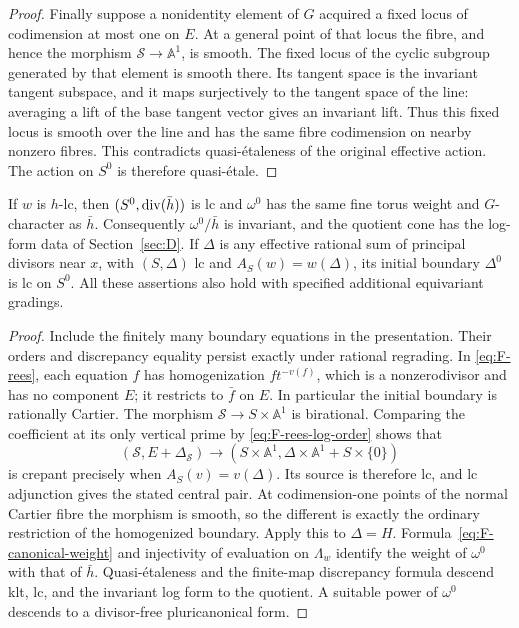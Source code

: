 \begin{proof}
Finally suppose a nonidentity element of $G$ acquired a fixed
locus of codimension at most one on $E$.  At a general point of
that locus the fibre, and hence the morphism $\mathcal S\to\mathbb A^1$,
is smooth.  The fixed locus of the cyclic subgroup generated by
that element is smooth there.  Its tangent space is the invariant
tangent subspace, and it maps surjectively to the tangent space
of the line: averaging a lift of the base tangent vector gives
an invariant lift.  Thus this fixed locus is smooth over the
line and has the same fibre codimension on nearby nonzero
fibres.  This contradicts quasi-\'{e}taleness of the original
effective action.  The action on $S^0$ is therefore
quasi-\'{e}tale.
\end{proof}

\begin{corollary}
\label{cor:F-lc-degeneration}
If $w$ is $h$-lc, then $(S^0,\operatorname{div}(\bar h))$ is lc and
$\omega^0$ has the same fine torus weight and $G$-character as
$\bar h$.  Consequently $\omega^0/\bar h$ is invariant, and the
quotient cone has the log-form data of Section~\ref{sec:D}.
If $\Delta$ is any effective rational sum of principal divisors
near $x$, with $(S,\Delta)$ lc and
$A_S(w)=w(\Delta)$, its initial boundary $\Delta^0$ is lc on
$S^0$.  All these assertions also hold with specified additional
equivariant gradings.
\end{corollary}

\begin{proof}
Include the finitely many boundary equations in the presentation.
Their orders and discrepancy equality persist exactly under
rational regrading.  In \eqref{eq:F-rees}, each equation $f$ has
homogenization $f t^{-v(f)}$, which is a nonzerodivisor and has
no component $E$; it restricts to $\bar f$ on $E$.  In particular
the initial boundary is rationally Cartier.  The morphism
$\mathcal S\to S\times\mathbb A^1$ is birational.  Comparing the
coefficient at its only vertical prime by
\eqref{eq:F-rees-log-order} shows that
\[
 (\mathcal S,E+\Delta_{\mathcal S})
 \longrightarrow (S\times\mathbb A^1,
                       \Delta\times\mathbb A^1+S\times\{0\})
\]
is crepant precisely when $A_S(v)=v(\Delta)$.
Its source is therefore lc, and lc adjunction gives the stated
central pair.  At codimension-one points of the normal Cartier
fibre the morphism is smooth, so the different is exactly the
ordinary restriction of the homogenized boundary.
Apply this to $\Delta=H$.  Formula~\eqref{eq:F-canonical-weight}
and injectivity of evaluation on $\Lambda_w$ identify the weight
of $\omega^0$ with that of $\bar h$.  Quasi-\'{e}taleness and the
finite-map discrepancy formula descend klt, lc, and the invariant
log form to the quotient.  A suitable power of $\omega^0$
descends to a divisor-free pluricanonical form.
\end{proof}

